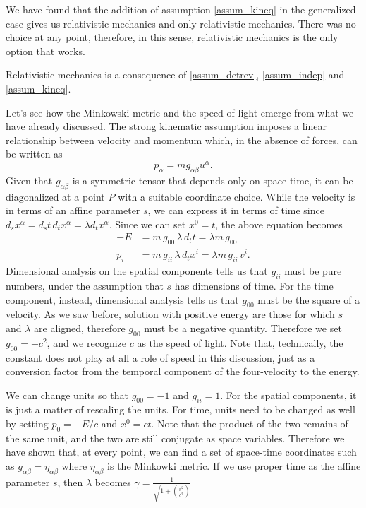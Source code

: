 We have found that the addition of assumption \ref{assum_kineq} in the generalized case gives us relativistic mechanics and only relativistic mechanics. There was no choice at any point, therefore, in this sense, relativistic mechanics is the only option that works.
\begin{insight}
	Relativistic mechanics is a consequence of \ref{assum_detrev}, \ref{assum_indep} and \ref{assum_kineq}.
\end{insight}

Let's see how the Minkowski metric and the speed of light emerge from what we have already discussed. The strong kinematic assumption imposes a linear relationship between velocity and momentum which, in the absence of forces, can be written as
\begin{equation}
	p_\alpha = m g_{\alpha\beta} u^\alpha.
\end{equation}
Given that $g_{\alpha\beta}$ is a symmetric tensor that depends only on space-time, it can be diagonalized at a point $P$ with a suitable coordinate choice. While the velocity is in terms of an affine parameter $s$, we can express it in terms of time since $d_s x^{\alpha} = d_s t \, d_t x^{\alpha} = \lambda d_t x^{\alpha}$. Since we can set $x^{0} = t$, the above equation becomes
\begin{equation}
	\begin{aligned}
		- E &= m \, g_{00} \, \lambda \, d_t t = \lambda m \, g_{00} \\
		p_i &= m \, g_{ii} \, \lambda \, d_t x^i = \lambda m \, g_{ii} \, v^i.
	\end{aligned}
\end{equation}
Dimensional analysis on the spatial components tells us that $g_{ii}$ must be pure numbers, under the assumption that $s$ has dimensions of time. For the time component, instead, dimensional analysis tells us that $g_{00}$ must be the square of a velocity. As we saw before, solution with positive energy are those for which $s$ and $\lambda$ are aligned, therefore $g_{00}$ must be a negative quantity. Therefore we set $g_{00} = - c^2$, and we recognize $c$ as the speed of light. Note that, technically, the constant does not play at all a role of speed in this discussion, just as a conversion factor from the temporal component of the four-velocity to the energy.

We can change units so that $g_{00} = -1$ and $g_{ii}=1$. For the spatial components, it is just a matter of rescaling the units. For time, units need to be changed as well by setting $p_{0} = -E/c$ and $x^{0} = ct$. Note that the product of the two remains of the same unit, and the two are still conjugate as space variables. Therefore we have shown that, at every point, we can find a set of space-time coordinates such as $g_{\alpha\beta} = \eta_{\alpha\beta}$ where $\eta_{\alpha\beta}$ is the Minkowki metric. If we use proper time as the affine parameter $s$, then $\lambda$ becomes $\gamma  = \frac{1}{\sqrt{1 + \left(\frac{v^2}{c^2}\right)}}$

